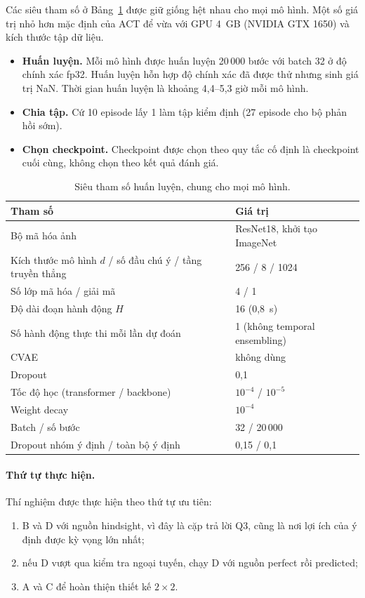 Các siêu tham số ở Bảng~\ref{tab:hparams} được giữ giống hệt nhau cho mọi mô hình. Một số giá trị nhỏ hơn mặc định của ACT để vừa với GPU 4~GB (NVIDIA GTX 1650) và kích thước tập dữ liệu.
\begin{itemize}
  \item \textbf{Huấn luyện.} Mỗi mô hình được huấn luyện 20\,000 bước với batch 32 ở độ chính xác fp32. Huấn luyện hỗn hợp độ chính xác đã được thử nhưng sinh giá trị NaN. Thời gian huấn luyện là khoảng 4,4--5,3 giờ mỗi mô hình.
  \item \textbf{Chia tập.} Cứ 10 episode lấy 1 làm tập kiểm định (27 episode cho bộ phản hồi sớm).
  \item \textbf{Chọn checkpoint.} Checkpoint được chọn theo quy tắc cố định là checkpoint cuối cùng, không chọn theo kết quả đánh giá.
\end{itemize}

\begin{table}[htbp]
  \centering
  \caption{Siêu tham số huấn luyện, chung cho mọi mô hình.}
  \label{tab:hparams}
  \begin{tabularx}{\textwidth}{@{}X l@{}}
    \toprule
    \textbf{Tham số} & \textbf{Giá trị} \\
    \midrule
    Bộ mã hóa ảnh & ResNet18, khởi tạo ImageNet \\
    Kích thước mô hình $d$ / số đầu chú ý / tầng truyền thẳng & 256 / 8 / 1024 \\
    Số lớp mã hóa / giải mã & 4 / 1 \\
    Độ dài đoạn hành động $H$ & 16 (0,8~s) \\
    Số hành động thực thi mỗi lần dự đoán & 1 (không temporal ensembling) \\
    CVAE & không dùng \\
    Dropout & 0,1 \\
    Tốc độ học (transformer / backbone) & $10^{-4}$ / $10^{-5}$ \\
    Weight decay & $10^{-4}$ \\
    Batch / số bước & 32 / 20\,000 \\
    Dropout nhóm ý định / toàn bộ ý định & 0,15 / 0,1 \\
    \bottomrule
  \end{tabularx}
\end{table}

\paragraph{Thứ tự thực hiện.} Thí nghiệm được thực hiện theo thứ tự ưu tiên:
\begin{enumerate}
  \item B và D với nguồn hindsight, vì đây là cặp trả lời Q3, cũng là nơi lợi ích của ý định được kỳ vọng lớn nhất;
  \item nếu D vượt qua kiểm tra ngoại tuyến, chạy D với nguồn perfect rồi predicted;
  \item A và C để hoàn thiện thiết kế $2\times2$.
\end{enumerate}


